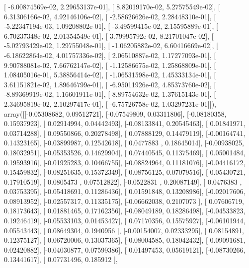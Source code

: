 \documentclass{article}
\begin{document}
       [ -6.00874569e-02,   2.29653137e-01],
       [  8.82019170e-02,   5.27575549e-02],
       [  6.31306166e-02,   4.92146106e-02],
       [ -2.58626626e-02,   2.28448310e-01],
       [ -5.22347194e-03,   1.09208802e-01],
       [ -3.49599415e-02,   2.15595889e-01],
       [  6.70237348e-02,   2.01354549e-01],
       [  3.79995792e-02,   8.21701047e-02],
       [ -5.02793429e-02,   1.29755048e-01],
       [ -1.06205882e-02,   6.60416669e-02],
       [ -6.18622864e-02,   4.01757336e-02],
       [  2.06510887e-02,   1.17277093e-01],
       [  9.90788081e-02,   7.66762147e-02],
       [ -1.12586675e-02,   1.25868809e-01],
       [  1.08405016e-01,   5.38856414e-02],
       [ -1.06531598e-02,   1.45333134e-01],
       [  3.61151821e-02,   1.89646799e-01],
       [ -6.95011926e-02,   4.85373760e-02],
       [ -8.89369919e-02,   1.16601911e-01],
       [  8.89754632e-02,   1.37615143e-01],
       [  2.34695819e-02,   2.10297417e-01],
       [ -6.75726758e-02,   1.03297231e-01]]), array([[-0.05308682,  0.09512721],
       [-0.07549809,  0.03311806],
       [-0.08180358,  0.15937923],
       [ 0.02914994,  0.04442493],
       [-0.08133841,  0.20545463],
       [ 0.01841971,  0.03714288],
       [ 0.09550866,  0.20278498],
       [ 0.07888129,  0.14479119],
       [-0.00164741,  0.14323165],
       [-0.03899987,  0.12542618],
       [ 0.0477883 ,  0.18645014],
       [-0.00938025,  0.18032951],
       [-0.05353526,  0.14629904],
       [ 0.07440545,  0.11375469],
       [ 0.05001484,  0.19593916],
       [-0.01925283,  0.10466755],
       [-0.08824964,  0.11181076],
       [-0.04416172,  0.15459832],
       [-0.08251635,  0.15372349],
       [ 0.08756125,  0.07079516],
       [ 0.05430721,  0.17910519],
       [ 0.0805473 ,  0.07512822],
       [-0.0522831 ,  0.20087149],
       [ 0.0476383 ,  0.03753395],
       [-0.05418691,  0.11286436],
       [ 0.01591848,  0.13208986],
       [-0.02017606,  0.08913952],
       [-0.02557317,  0.11335175],
       [-0.06662038,  0.2107073 ],
       [ 0.07606719,  0.18173643],
       [ 0.01881465,  0.17162356],
       [-0.08049189,  0.18286498],
       [-0.04533823,  0.19246419],
       [-0.05533103,  0.01453427],
       [ 0.07170356,  0.15575927],
       [-0.06101944,  0.05543443],
       [ 0.08649304,  0.1940956 ],
       [-0.00154007,  0.02333295],
       [ 0.08154891,  0.12375127],
       [ 0.06720006,  0.13037365],
       [-0.08004585,  0.18042432],
       [ 0.09091681,  0.02420882],
       [-0.04030877,  0.07599386],
       [ 0.01497453,  0.05619121],
       [-0.08730266,  0.13441617],
       [ 0.07731496,  0.185912  ],
\end{document}
